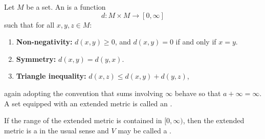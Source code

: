 \begin{definition} \label{definition:extended_metric_on_a_set}
    Let \(M\) be a set. An  is a function
    \[
    d : M \times M \to [0, \infty]
    \]
    such that for all \(x,y,z \in M\):
    \begin{enumerate}
        \item \textbf{Non-negativity:} \quad \(d(x,y) \geq 0\), and \(d(x,y) = 0\) if and only if \(x = y\).
        \item \textbf{Symmetry:} \quad \(d(x,y) = d(y,x)\).
        \item \textbf{Triangle inequality:} \quad \(d(x,z) \leq d(x,y) + d(y,z)\),
    \end{enumerate}
    again adopting the convention that sums involving \(\infty\) behave so that \(a + \infty = \infty\). A set equipped with an extended metric is called an .

    If the range of the extended metric is contained in $[0,\infty)$, then the extended metric is a  in the usual sense and $V$ may be called a .
\end{definition}
